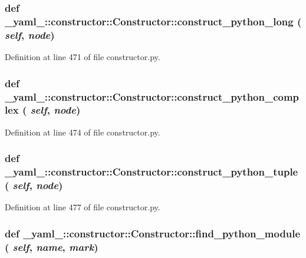 \subsubsection{\setlength{\rightskip}{0pt plus 5cm}def \_\-yaml\_\-::constructor::Constructor::construct\_\-python\_\-long ( {\em self},  {\em node})}\label{class__yaml___1_1constructor_1_1Constructor_387b34a24172f33e7c154131ebf31eac}




Definition at line 471 of file constructor.py.
\subsubsection{\setlength{\rightskip}{0pt plus 5cm}def \_\-yaml\_\-::constructor::Constructor::construct\_\-python\_\-complex ( {\em self},  {\em node})}\label{class__yaml___1_1constructor_1_1Constructor_0f7229f8dbb6f78c37bbb20b380b2e39}




Definition at line 474 of file constructor.py.
\subsubsection{\setlength{\rightskip}{0pt plus 5cm}def \_\-yaml\_\-::constructor::Constructor::construct\_\-python\_\-tuple ( {\em self},  {\em node})}\label{class__yaml___1_1constructor_1_1Constructor_04b28129087bc5eb6b5b115c338e961c}




Definition at line 477 of file constructor.py.
\subsubsection{\setlength{\rightskip}{0pt plus 5cm}def \_\-yaml\_\-::constructor::Constructor::find\_\-python\_\-module ( {\em self},  {\em name},  {\em mark})}\label{class__yaml___1_1constructor_1_1Constructor_0498fab275446c2c29c4981d72131e0e}




